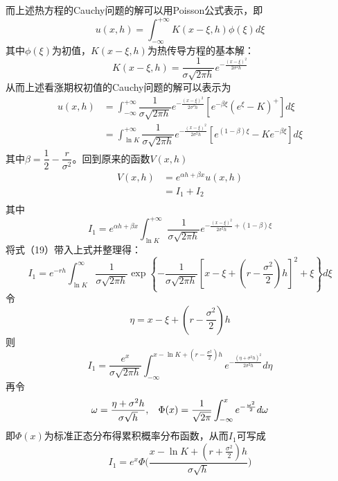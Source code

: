 \documentclass[UTF8，12pt]{ctexart}
\numberwithin{equation}{section}
\begin{document}
而上述热方程的Cauchy问题的解可以用Poisson公式表示，即
\begin{equation}
	u(x,h)=\int_{-\infty}^{+\infty}K(x-\xi,h)\phi(\xi)d\xi
\end{equation}
其中$\phi(\xi)$为初值，$K(x-\xi,h)$为热传导方程的基本解：
\begin{equation}
	K(x-\xi,h)=\dfrac{1}{\sigma\sqrt{2\pi h}}e^{-\frac{(x-\xi)^2}{2\sigma^2 h}}
\end{equation}
从而上述看涨期权初值的Cauchy问题的解可以表示为
\begin{equation}
	\begin{split}
		u(x,h)&=\int_{-\infty}^{+\infty}\dfrac{1}{\sigma\sqrt{2\pi h}}e^{-\frac{(x-\xi)^2}{2\sigma^2 h}}\left[e^{-\beta\xi}(e^\xi-K)^+\right]d\xi\\
		&=\int_{\ln K}^{+\infty}\dfrac{1}{\sigma\sqrt{2\pi h}}e^{-\frac{(x-\xi)^2}{2\sigma^2 h}}\left[e^{(1-\beta)\xi}-Ke^{-\beta\xi}\right]d\xi
	\end{split}
\end{equation}
其中$\beta=\dfrac{1}{2}-\dfrac{r}{\sigma^2}$。回到原来的函数$V(x,h)$
\begin{equation}
	\begin{split}
		V(x,h)&=e^{\alpha h+\beta x}u(x,h)\\
		&=I_1+I_2\\
	\end{split}
\end{equation}
其中
\begin{equation}
	I_1=e^{\alpha h+\beta x}\int_{\ln K}^{+\infty}\dfrac{1}{\sigma\sqrt{2\pi h}}e^{-\frac{(x-\xi)^2}{2\sigma^2 h}+(1-\beta)\xi}
\end{equation}
将式（19）带入上式并整理得：
\begin{equation}
	I_1=e^{-rh}\int_{\ln K}^{\infty}\dfrac{1}{\sigma\sqrt{2\pi h}}\exp\left\{-\dfrac{1}{\sigma\sqrt{2\pi h}}\left[x-\xi+(r-\dfrac{\sigma^2}{2})h\right]^2+\xi\right\}d\xi
\end{equation}
令
\begin{equation}
	\eta=x-\xi+(r-\dfrac{\sigma^2}{2})h
\end{equation}
则
\begin{equation}
	I_1=\dfrac{e^x}{\sigma\sqrt{2\pi h}}\int_{-\infty}^{x-\ln K+(r-\frac{\sigma^2}{2})h}e^{-\frac{(\eta+\sigma^2h)^2}{2\sigma^2 h}}d\eta
\end{equation}
再令
\begin{equation}
	\omega=\dfrac{\eta+\sigma^2 h}{\sigma\sqrt{h}},\hspace{0.3cm}\Phi(x)=\dfrac{1}{\sqrt{2\pi}}\int_{-\infty}^{x}e^{-\frac{\omega^2}{2}}d\omega
\end{equation}
即$\Phi(x)$为标准正态分布得累积概率分布函数，从而$I_1$可写成
\begin{equation}
	I_1=e^x\Phi\Big(\dfrac{x-\ln K+(r+\frac{\sigma^2}{2})h}{\sigma\sqrt{h}}\Big)
\end{equation}
\end{document}
